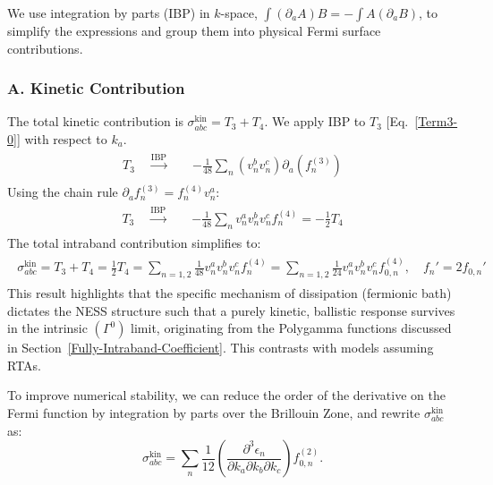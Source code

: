 \documentclass[twocolumn, prx, reprint, amsfonts, amsmath, amssymb, longbibliography, floatfix, aps]{revtex4-2}
\begin{document}
We use integration by parts (IBP) in $k$-space, $\int (\partial_a A) B = - \int A (\partial_a B)$, to simplify the expressions and group them into physical Fermi surface contributions.

\subsubsection*{A. Kinetic Contribution}
\label{A-Kinetic-Contribution}
The total kinetic contribution is $\sigma_{abc}^{\text{kin}} = T_3 + T_4$.
We apply IBP to $T_3$ [Eq.~\eqref{Term3-0}] with respect to $k_a$.
\begin{align}
\begin{aligned}
T_3 \quad \xrightarrow{\text{IBP}} \quad & -\frac{1}{48} \sum_n (v_n^b v_n^c) \partial_a (f_n^{(3)})
\end{aligned}
\end{align}
Using the chain rule $\partial_a f_n^{(3)} = f_n^{(4)} v_n^a$:
\begin{align}
\begin{aligned}
T_3 \quad \xrightarrow{\text{IBP}} \quad & -\frac{1}{48} \sum_n v_n^a v_n^b v_n^c f_n^{(4)} = -\frac{1}{2} T_4
\end{aligned}
\end{align}
The total intraband contribution simplifies to:
\begin{align}
\begin{aligned}
\sigma_{abc}^{\text{kin}} = T_3 + T_4 = \frac{1}{2}T_4 = \sum_{n=1,2} \frac{1}{48} v_n^a v_n^b v_n^c f_n^{(4)}
=\sum_{n=1,2} \frac{1}{24} v_n^a v_n^b v_n^c f_{0,n}^{(4)} ,
\quad
f_n' = 2 f_{0,n}'
\end{aligned}
\end{align}
This result highlights that the specific mechanism of dissipation (fermionic bath) dictates the NESS structure such that a purely kinetic, ballistic response survives in the intrinsic $\left(\Gamma^0\right)$ limit, originating from the Polygamma functions discussed in Section~\ref{Fully-Intraband-Coefficient}. This contrasts with models assuming RTAs.

To improve numerical stability, we can reduce the order of the derivative on the Fermi function by integration by parts over the Brillouin Zone, and rewrite $\sigma^{\text{kin}}_{abc}$ as: 
\begin{equation}
\sigma^{\text{kin}}_{abc} = \sum_{n} \frac{1}{12} \left( \frac{\partial^3 \epsilon_n}{\partial k_a \partial k_b \partial k_c} \right) f_{0,n}^{(2)}.
\end{equation}
\end{document}

